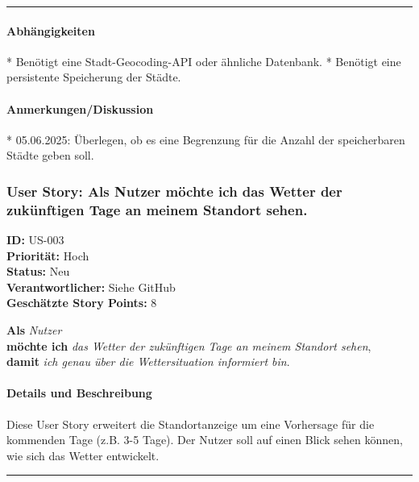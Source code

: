 \documentclass{article}
\begin{document}
\vspace{0.5em}
\hrule

\paragraph{Abhängigkeiten}
* Benötigt eine Stadt-Geocoding-API oder ähnliche Datenbank.
* Benötigt eine persistente Speicherung der Städte.

\paragraph{Anmerkungen/Diskussion}
* 05.06.2025: Überlegen, ob es eine Begrenzung für die Anzahl der speicherbaren Städte geben soll.

\clearpage

\subsubsection{User Story: Als Nutzer möchte ich das Wetter der zukünftigen Tage an meinem Standort sehen.}
\textcolor{storyblue}{\textbf{ID:}} US-003 \\
\textcolor{storyblue}{\textbf{Priorität:}} Hoch \\
\textcolor{storyblue}{\textbf{Status:}} Neu \\
\textcolor{storyblue}{\textbf{Verantwortlicher:}} Siehe GitHub \\
\textcolor{storyblue}{\textbf{Geschätzte Story Points:}} 8

\vspace{0.5em}

\textcolor{storygreen}{\textbf{Als}} \textit{Nutzer} \\
\textcolor{storygreen}{\textbf{möchte ich}} \textit{das Wetter der zukünftigen Tage an meinem Standort sehen}, \\
\textcolor{storygreen}{\textbf{damit}} \textit{ich genau über die Wettersituation informiert bin}.

\vspace{1em}

\paragraph{Details und Beschreibung}
Diese User Story erweitert die Standortanzeige um eine Vorhersage für die kommenden Tage (z.B. 3-5 Tage). Der Nutzer soll auf einen Blick sehen können, wie sich das Wetter entwickelt.

\vspace{0.5em}
\hrule
\end{document}
